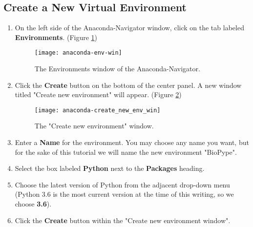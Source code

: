 \subsection{Create a New Virtual Environment}
    \begin{enumerate}
        \item On the left side of the Anaconda-Navigator window, click on the tab labeled \textbf{Environments}. (Figure \ref{anaconda-env-win}) 
        \begin{figure}
            \texttt{[image: anaconda-env-win]}
            \caption{The Environments window of the Anaconda-Navigator.}
            \label{anaconda-env-win}
        \end{figure}
        \item Click the \textbf{Create} button on the bottom of the center panel. A new window titled "Create new environment" will appear. (Figure \ref{anaconda-create-new-env-win})
        \begin{figure}[h]
            \begin{center}
            \texttt{[image: anaconda-create\_new\_env\_win]}
            \caption{The "Create new environment" window.}
            \label{anaconda-create-new-env-win}
            \end{center}
        \end{figure}
        \item Enter a \textbf{Name} for the environment. You may choose any name you want, but for the sake of this tutorial we will name the new environment "BioPype".
        \item Select the box labeled \textbf{Python} next to the \textbf{Packages} heading.
        \item Choose the latest version of Python from the adjacent drop-down menu (Python 3.6 is the most current version at the time of this writing, so we choose \textbf{3.6}).
        \item Click the \textbf{Create} button within the "Create new environment window".
    \end{enumerate}

